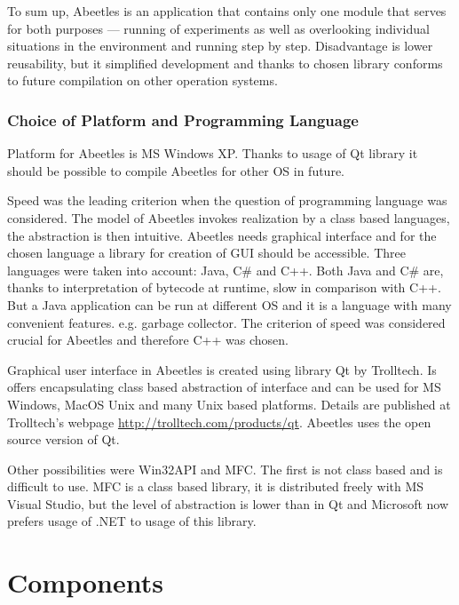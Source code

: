 \documentclass[a4paper,12pt]{report}
\begin{document}
To sum up, Abeetles is an application that contains only one module that serves for both purposes --- running of experiments as well as overlooking individual situations in the environment and running step by step. Disadvantage is lower reusability, but it simplified development and thanks to chosen library conforms to future compilation on other operation systems.

\subsubsection{Choice of Platform and Programming Language}

Platform for Abeetles is MS Windows XP. Thanks to usage of Qt library it should be possible to compile Abeetles for other OS in future.

Speed was the leading criterion when the question of programming language was considered. The model of Abeetles invokes realization by a class based languages, the abstraction is then intuitive. Abeetles needs graphical interface and for the chosen language a library for creation of GUI should be accessible. Three languages were taken into account: Java, C\# and C++. Both Java and C\# are, thanks to interpretation of bytecode at runtime, slow in comparison with C++. But a Java application can be run at different OS and it is a language with many convenient features. e.g. garbage collector. The criterion of speed was considered crucial for Abeetles and therefore C++ was chosen.

Graphical user interface in Abeetles is created using library Qt by Trolltech. Is offers encapsulating class based abstraction of interface and can be used for MS Windows, MacOS Unix and many Unix based platforms. Details are published at Trolltech's webpage \url{http://trolltech.com/products/qt}. Abeetles uses the open source version of Qt.

Other possibilities were Win32API and MFC. The first is not class based and is difficult to use. MFC is a class based library, it is distributed freely with MS  Visual Studio, but the level of abstraction is lower than in Qt and Microsoft now prefers usage of .NET to usage of this library.




\section {Components}
\end{document}
